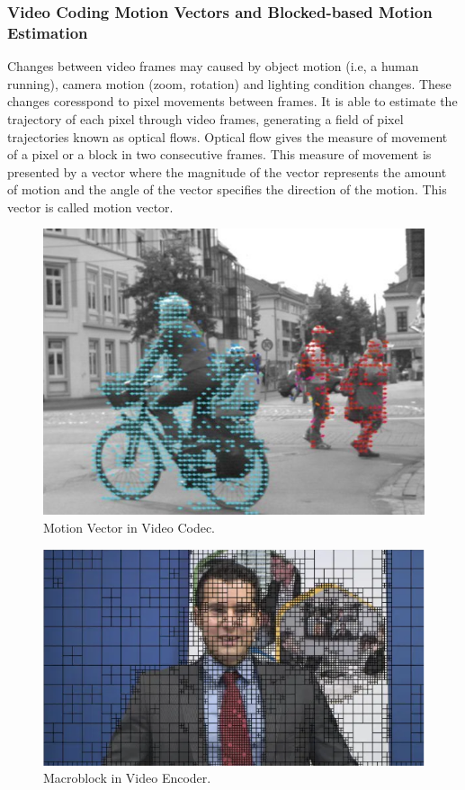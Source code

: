 \subsubsection{Video Coding Motion Vectors and Blocked-based Motion Estimation}
	Changes between video frames may caused by object motion (i.e, a human running), camera motion (zoom, rotation) and lighting condition changes.  These changes coresspond to pixel movements between frames. It is able to estimate the trajectory of each pixel through video frames, generating a field of pixel trajectories known as optical flows. Optical flow gives the measure of movement of a pixel or a block in two consecutive frames. This measure of movement is presented by a vector where the magnitude of the vector represents the amount of motion and the angle of the vector specifies the direction of the motion. This vector is called motion vector. 
\begin{figure}
\centering
 \includegraphics[width=0.8\linewidth]{Figures/opticalflow.jpeg}
 \caption{Motion Vector in Video Codec.}
 \label{fig:opticalflow}
\end{figure}
\begin{figure}
\centering
 \includegraphics[width=0.8\linewidth]{Figures/macroblock.png}
 \caption{Macroblock in Video Encoder.}
 \label{fig:macroblock}
\end{figure}
